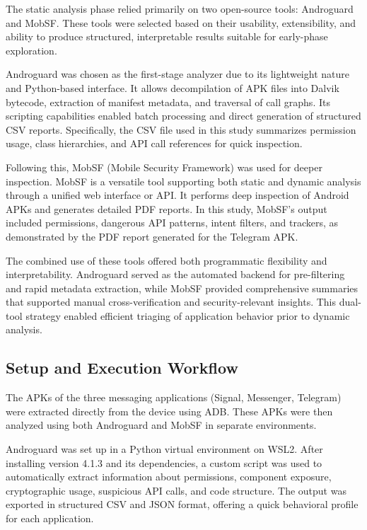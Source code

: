 \documentclass[a4paper,12pt]{report}
\begin{document}
The static analysis phase relied primarily on two open-source tools: Androguard and MobSF. These tools were selected based on their usability, extensibility, and ability to produce structured, interpretable results suitable for early-phase exploration.

Androguard was chosen as the first-stage analyzer due to its lightweight nature and Python-based interface. It allows decompilation of APK files into Dalvik bytecode, extraction of manifest metadata, and traversal of call graphs. Its scripting capabilities enabled batch processing and direct generation of structured CSV reports. Specifically, the CSV file used in this study summarizes permission usage, class hierarchies, and API call references for quick inspection.

Following this, MobSF (Mobile Security Framework) was used for deeper inspection. MobSF is a versatile tool supporting both static and dynamic analysis through a unified web interface or API. It performs deep inspection of Android APKs and generates detailed PDF reports. In this study, MobSF's output included permissions, dangerous API patterns, intent filters, and trackers, as demonstrated by the PDF report generated for the Telegram APK.

The combined use of these tools offered both programmatic flexibility and interpretability. Androguard served as the automated backend for pre-filtering and rapid metadata extraction, while MobSF provided comprehensive summaries that supported manual cross-verification and security-relevant insights. This dual-tool strategy enabled efficient triaging of application behavior prior to dynamic analysis.



\subsection{Setup and Execution Workflow}

The APKs of the three messaging applications (Signal, Messenger, Telegram) were extracted directly from the device using ADB. These APKs were then analyzed using both Androguard and MobSF in separate environments.

Androguard was set up in a Python virtual environment on WSL2. After installing version 4.1.3 and its dependencies, a custom script was used to automatically extract information about permissions, component exposure, cryptographic usage, suspicious API calls, and code structure. The output was exported in structured CSV and JSON format, offering a quick behavioral profile for each application.
\end{document}
